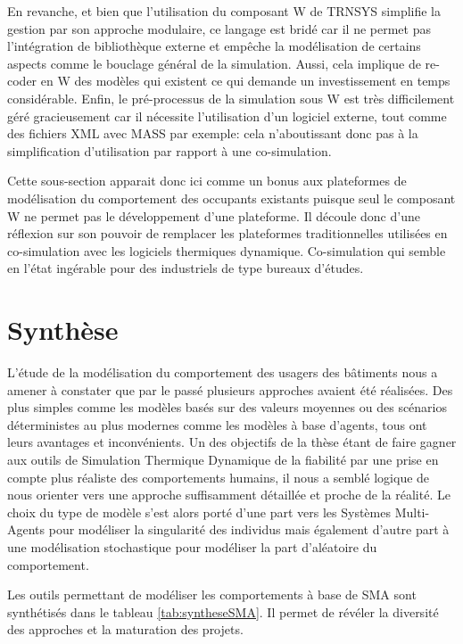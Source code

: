 En revanche, et bien que l'utilisation du composant W de TRNSYS simplifie la gestion par son approche modulaire, ce langage est bridé car il ne permet pas l'intégration de bibliothèque externe et empêche la modélisation de certains aspects comme le bouclage général de la simulation. Aussi, cela implique de re-coder en W des modèles qui existent ce qui demande un investissement en temps considérable. Enfin, le pré-processus de la simulation sous W est très difficilement géré gracieusement car il nécessite l'utilisation d'un logiciel externe, tout comme des fichiers XML avec MASS par exemple: cela n'aboutissant donc pas à la simplification d'utilisation par rapport à une co-simulation. 

Cette sous-section apparait donc ici comme un bonus aux plateformes de modélisation du comportement des occupants existants puisque seul le composant W ne permet pas le développement d'une plateforme. Il découle donc d'une réflexion sur son pouvoir de remplacer les plateformes traditionnelles utilisées en co-simulation avec les logiciels thermiques dynamique. Co-simulation qui semble en l'état ingérable pour des industriels de type bureaux d'études.

\section{Synthèse}

L'étude de la modélisation du comportement des usagers des bâtiments nous a amener à constater que par le passé plusieurs approches avaient été réalisées. Des plus simples comme les modèles basés sur des valeurs moyennes ou des scénarios déterministes au plus modernes comme les modèles à base d'agents, tous ont leurs avantages et inconvénients. Un des objectifs de la thèse étant de faire gagner aux outils de Simulation Thermique Dynamique de la fiabilité par une prise en compte plus réaliste des comportements humains, il nous a semblé logique de nous orienter vers une approche suffisamment détaillée et proche de la réalité. Le choix du type de modèle s'est alors porté d'une part vers les Systèmes Multi-Agents pour modéliser la singularité des individus mais également d'autre part à une modélisation stochastique pour modéliser la part d'aléatoire du comportement.

Les outils permettant de modéliser les comportements à base de SMA sont synthétisés dans le tableau \ref{tab:syntheseSMA}. Il permet  de révéler la diversité des approches et la maturation des projets.

